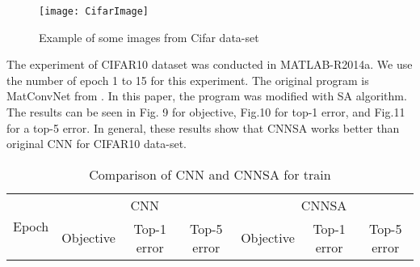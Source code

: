 \documentclass[10pt,letterpaper]{article}
\begin{document}
\begin{figure}
    \texttt{[image: CifarImage]}
    \caption{Example of some images from Cifar data-set}
    \label{fig:my_label}
\end{figure}

The experiment of CIFAR10 dataset was conducted in MATLAB-R2014a. We use the number of epoch 1 to 15 for this experiment. The original program is MatConvNet from \cite{vedaldi15matconvnet}. In this paper, the program was modified with SA algorithm. The results can be seen in Fig. 9 for objective, Fig.10 for top-1 error, and Fig.11 for a top-5 error. In general, these results show that CNNSA works better than original CNN for CIFAR10 data-set.


\begin{table}[]
\small
\caption{Comparison of CNN and CNNSA for train}
\label{tab:my_label}

\begin{tabular}{c c c c c c c}
\hline
\multicolumn{1}{c}{\multirow{2}{*}{Epoch}} & \multicolumn{3}{c}{CNN} &
\multicolumn{3}{c}{CNNSA}\\
\cline{2-7}

\multicolumn{1}{r}{}     & \multicolumn{1}{c}{Objective} & \multicolumn{1}{c}{Top-1 error} & \multicolumn{1}{c}{Top-5 error} &
\multicolumn{1}{c}{Objective} & \multicolumn{1}{c}{Top-1 error} & \multicolumn{1}{c}{Top-5 error}\\
\hline


\end{tabular}
\end{table}
\end{document}
